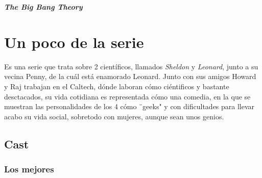 \documentclass[a5paper, 11pt]{article}
\begin{document}
\begin{center}
\textit{\textbf{\huge{The Big Bang Theory}}}    
\end{center}

\section{Un poco de la serie}
\textrm{Es una serie que trata sobre 2 científicos, llamados \emph{Sheldon} y \emph{Leonard}, junto a su vecina Penny, de la cuál está enamorado Leonard. Junto con sus amigos Howard y Raj trabajan en el Caltech, dónde laboran cómo ciéntificos y bastante desctacados, su vida cotidiana es representada cómo una comedia, en la que se muestran las personalidades de los 4 cómo ¨geeks" y con dificultades para llevar acabo su vida social, sobretodo con mujeres, aunque sean unos genios.}

\subsection{Cast}
 \subsubsection{Los mejores}
\end{document}
